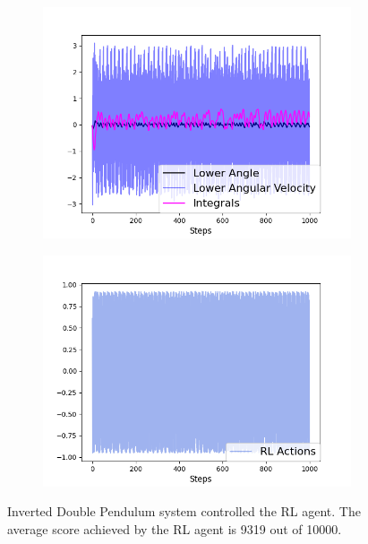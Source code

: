 \begin{figure}[H]
\centering
\begin{subfigure}{0.4\textwidth}
  \centering
  \includegraphics[width=\linewidth]{double_RL.png}
\end{subfigure}%
\begin{subfigure}{.4\textwidth}
  \centering
  \includegraphics[width=\linewidth]{double_RL_actions.png}
\end{subfigure}
\caption{Inverted Double Pendulum system controlled the RL agent. The average score achieved by the RL agent is 9319 out of 10000.}
\label{fig:double_rl}
\end{figure}

